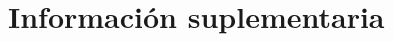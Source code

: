 \documentclass[fleqn,10pt]{SelfArx}
\begin{document}



\newpage
\onecolumn
\section{Informaci\'on suplementaria}\label{sec: complementaria}
\end{document}
